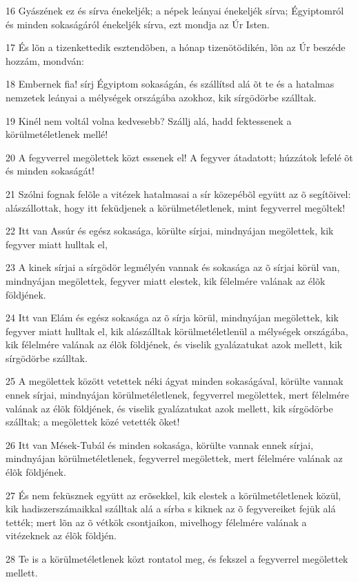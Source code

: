 \par 16 Gyászének ez és sírva énekeljék; a népek leányai énekeljék sírva; Égyiptomról és minden sokaságáról énekeljék sírva, ezt mondja az Úr Isten.
\par 17 És lõn a tizenkettedik esztendõben, a hónap tizenötödikén, lõn az Úr beszéde hozzám, mondván:
\par 18 Embernek fia! sírj Égyiptom sokaságán, és szállítsd alá õt te és a hatalmas nemzetek leányai a mélységek országába azokhoz, kik sírgödörbe szálltak.
\par 19 Kinél nem voltál volna kedvesebb? Szállj alá, hadd fektessenek a körülmetéletlenek mellé!
\par 20 A fegyverrel megölettek közt essenek el! A fegyver átadatott; húzzátok lefelé õt és minden sokaságát!
\par 21 Szólni fognak felõle a vitézek hatalmasai a sír közepébõl együtt az õ segítõivel: alászállottak, hogy itt feküdjenek a körülmetéletlenek, mint fegyverrel megöltek!
\par 22 Itt van Assúr és egész sokasága, körülte sírjai, mindnyájan megölettek, kik fegyver miatt hulltak el,
\par 23 A kinek sírjai a sírgödör legmélyén vannak és sokasága az õ sírjai körül van, mindnyájan megölettek, fegyver miatt elestek, kik félelmére valának az élõk földjének.
\par 24 Itt van Elám és egész sokasága az õ sírja körül, mindnyájan megölettek, kik fegyver miatt hulltak el, kik alászálltak körülmetéletlenül a mélységek országába, kik félelmére valának az élõk földjének, és viselik gyalázatukat azok mellett, kik sírgödörbe szálltak.
\par 25 A megölettek között vetettek néki ágyat minden sokaságával, körülte vannak ennek sírjai, mindnyájan körülmetéletlenek, fegyverrel megölettek, mert félelmére valának az élõk földjének, és viselik gyalázatukat azok mellett, kik sírgödörbe szálltak; a megölettek közé vetették õket!
\par 26 Itt van Mések-Tubál és minden sokasága, körülte vannak ennek sírjai, mindnyájan körülmetéletlenek, fegyverrel megölettek, mert félelmére valának az élõk földjének.
\par 27 És nem feküsznek együtt az erõsekkel, kik elestek a körülmetéletlenek közül, kik hadiszerszámaikkal szálltak alá a sírba s kiknek az õ fegyvereiket fejük alá tették; mert lõn az õ vétkök csontjaikon, mivelhogy félelmére valának a vitézeknek az élõk földjén.
\par 28 Te is a körülmetéletlenek közt rontatol meg, és fekszel a fegyverrel megölettek mellett.
